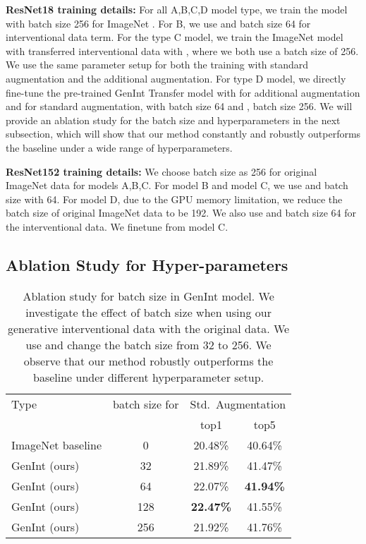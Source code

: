 \documentclass[final]{cvpr}
\begin{document}
\begin{subappendices}
\textbf{ResNet18 training details:} For all A,B,C,D model type, we train the model with batch size 256 for ImageNet . For B, we use  and batch size 64 for interventional data  term. For the type C model, we train the ImageNet model with transferred interventional data  with , where we both use a batch size of 256. We use the same parameter setup for both the training with standard augmentation and the additional augmentation. For type D model, we directly fine-tune the pre-trained GenInt Transfer model with  for additional augmentation and  for standard augmentation, with batch size 64 and , batch size 256. We will provide an ablation study for the batch size and  hyperparameters in the next subsection, which will show that our method constantly and robustly outperforms the baseline under a wide range of hyperparameters.


\textbf{ResNet152 training details:} We choose batch size as 256 for original ImageNet data  for models A,B,C. For model B and model C, we use  and batch size with 64. For model D, due to the GPU memory limitation, we reduce the batch size of original ImageNet data  to be 192. We also use  and batch size 64 for the interventional data. We finetune from model C.


\subsection{Ablation Study for Hyper-parameters}

\begin{table}[t]
\begin{center}
    \centering
    \scriptsize
    \begin{tabular}{lc|cc}
         \toprule
          Type & batch size for  &  \multicolumn{2}{c}{Std.\ Augmentation}  \\
          &  & top1   & top5 \\
         \midrule  
ImageNet baseline \cite{He_2016} & 0 & 20.48\% & 40.64\% \\
          \midrule
          GenInt (ours) & 32 & 21.89\% & 41.47\% \\
          GenInt (ours) & 64 & 22.07\% & \textbf{41.94\%} \\
          GenInt (ours) & 128 & \textbf{22.47\%} & 41.55\% \\
          GenInt (ours) & 256 & 21.92\% & 41.76\%  \\
         \bottomrule
    \end{tabular}
\end{center}
\caption{Ablation study for batch size in GenInt model. We investigate the effect of batch size when using our generative interventional data with the original data. We use  and change the batch size from 32 to 256. We observe that our method robustly outperforms the baseline under different hyperparameter setup.}  
\label{tab:objectnet-ablation-bs}
\end{table}


\end{subappendices}
\end{document}
